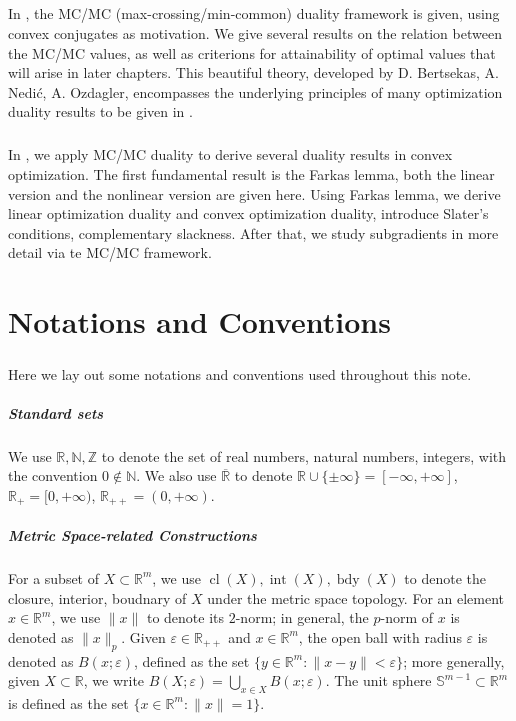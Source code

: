 \paragraph{}In , the MC/MC (max-crossing/min-common) duality framework is given, using convex conjugates as motivation. We give several results on the relation between the MC/MC values, as well as criterions for attainability of optimal values that will arise in later chapters. This beautiful theory, developed by D. Bertsekas, A. Nedi\'{c}, A. Ozdagler, encompasses the underlying principles of many optimization duality results to be given in .

\paragraph{}In , we apply MC/MC duality to derive several duality results in convex optimization. The first fundamental result is the Farkas lemma, both the linear version and the nonlinear version are given here. Using Farkas lemma, we derive linear optimization duality and convex optimization duality, introduce Slater's conditions, complementary slackness. After that, we study subgradients in more detail via te MC/MC framework.

\chapter*{Notations and Conventions}

\paragraph{}Here we lay out some notations and conventions used throughout this note.

\paragraph{Standard sets}We use $\mathbb{R,N,Z}$ to denote the set of real numbers, natural numbers, integers, with the convention $0\notin \mathbb{N}$. We also use $\overline{\mathbb{R}}$ to denote $\mathbb{R}\cup\{\pm\infty\}=[-\infty,+\infty]$, $\mathbb{R}_{+}=[0,+\infty)$, $\mathbb{R}_{++}=(0,+\infty)$.

\paragraph{Metric Space-related Constructions}For a subset of $X\subset \mathbb{R}^m$, we use $\operatorname{cl}(X),\operatorname{int}(X),\operatorname{bdy}(X)$ to denote the closure, interior, boudnary of $X$ under the metric space topology. For an element $x\in \mathbb{R}^m$, we use $\|x\|$ to denote its $2$-norm; in general, the $p$-norm of $x$ is denoted as $\|x\|_p$. Given $\varepsilon \in \mathbb{R}_{++}$ and $x\in \mathbb{R}^m$, the open ball with radius $\varepsilon$ is denoted as $B(x;\varepsilon )$, defined as the set $\{y\in \mathbb{R}^m:\|x-y\|<\varepsilon \}$; more generally, given $X\subset \mathbb{R}$, we write $B(X;\varepsilon )=\bigcup_{x\in X}B(x;\varepsilon )$. The unit sphere $\mathbb{S}^{m-1}\subset \mathbb{R}^m$ is defined as the set $\{x\in \mathbb{R}^m:\|x\|=1\}$.

